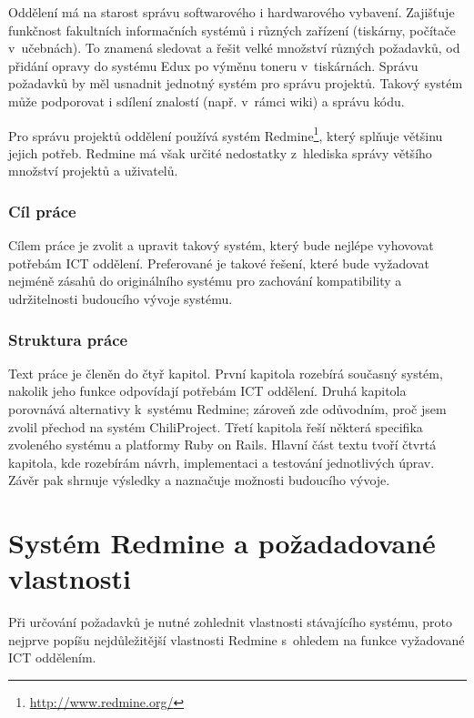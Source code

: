 \documentclass[thesis=B,czech]{FITthesis}[2012/05/02]
\begin{document}
\begin{introduction}

Oddělení   má na starost správu softwarového i hardwarového vybavení. Zajišťuje funkčnost fakultních informačních systémů i různých zařízení (tiskárny, počítače v~učebnách). To znamená sledovat a řešit velké množství různých požadavků, od přidání opravy do systému Edux po výměnu toneru v~tiskárnách. Správu požadavků by měl usnadnit jednotný systém pro správu projektů. Takový systém může podporovat i sdílení znalostí (např. v~rámci \gls{wiki}) a správu kódu.

Pro správu projektů oddělení používá systém Redmine\footnote{\url{http://www.redmine.org/}}, který splňuje většinu jejich potřeb. Redmine má však určité nedostatky z~hlediska správy většího množství projektů a uživatelů.

\subsection{Cíl práce}

Cílem práce je zvolit a upravit takový systém, který bude nejlépe vyhovovat potřebám ICT oddělení. Preferované je takové řešení, které bude vyžadovat nejméně zásahů do originálního systému pro zachování kompatibility a udržitelnosti budoucího vývoje systému.

\subsection{Struktura práce}

Text práce je členěn do čtyř kapitol. První kapitola rozebírá současný systém, nakolik jeho funkce odpovídají potřebám ICT oddělení. Druhá kapitola porovnává alternativy k~systému Redmine; zároveň zde odůvodním, proč jsem zvolil přechod na systém ChiliProject. Třetí kapitola řeší některá specifika zvoleného systému a platformy Ruby on Rails. Hlavní část textu tvoří čtvrtá kapitola, kde rozebírám návrh, implementaci a testování jednotlivých úprav. Závěr pak shrnuje výsledky a naznačuje možnosti budoucího vývoje.

\end{introduction}

\chapter{Systém Redmine a požadadované vlastnosti}

Při určování požadavků je nutné zohlednit vlastnosti stávajícího
systému, proto nejprve popíšu nejdůležitější vlastnosti Redmine
s~ohledem na funkce vyžadované ICT oddělením.
\end{document}
